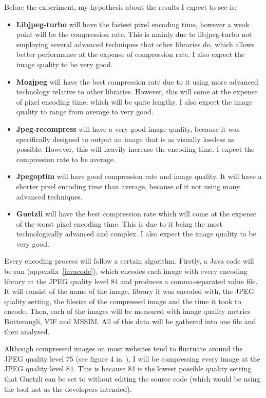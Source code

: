 \documentclass[12pt]{article}
\begin{document}
Before the experiment, my hypothesis about the results I expect to see is:
\begin{itemize}
	\item \textbf{Libjpeg-turbo} will have the fastest pixel encoding time, however a weak point will be the compression rate. This is mainly due to libjpeg-turbo not employing several advanced techniques that other libraries do, which allows better performance at the expense of compression rate. I also expect the image quality to be very good.
	\item \textbf{Mozjpeg} will have the best compression rate due to it using more advanced technology relative to other libraries. However, this will come at the expense of pixel encoding time, which will be quite lengthy. I also expect the image quality to range from average to very good.
	\item \textbf{Jpeg-recompress} will have a very good image quality, because it was specifically designed to output an image that is as visually lossless as possible. However, this will heavily increase the encoding time. I expect the compression rate to be average.
	\item \textbf{Jpegoptim} will have good compression rate and image quality. It will have a shorter pixel encoding time than average, because of it not using many advanced techniques.
	\item \textbf{Guetzli} will have the best compression rate which will come at the expense of the worst pixel encoding time. This is due to it being the most technologically advanced and complex. I also expect the image quality to be very good.
\end{itemize}
Every encoding process will follow a certain algorithm. Firstly, a Java code will be run (appendix~\ref{javacode}), which encodes each image with every encoding library at the JPEG quality level 84 and produces a comma-separated value file. It will consist of the name of the image, library it was encoded with, the JPEG quality setting, the filesize of the compressed image and the time it took to encode. Then, each of the images will be measured with image quality metrics Butteraugli, VIF and MSSIM. All of this data will be gathered into one file and then analysed.

Although compressed images on most websites tend to fluctuate around the JPEG quality level 75 (see figure 4 in~\cite{qualitymark}), I will be compressing every image at the JPEG quality level 84. This is because 84 is the lowest possible quality setting that Guetzli can be set to without editing the source code (which would be using the tool not as the developers intended).
\end{document}
